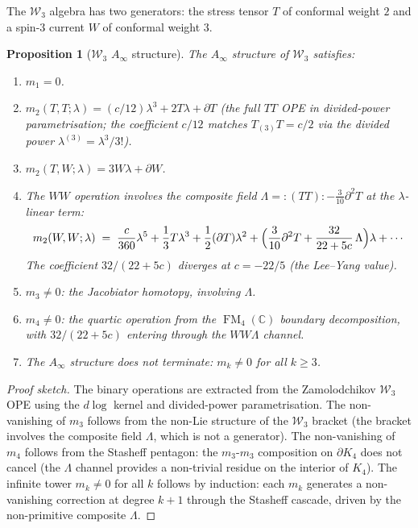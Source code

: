 \documentclass[11pt,reqno]{amsart}
\newtheorem{proposition}[theorem]{Proposition}
\theoremstyle{definition}
\theoremstyle{remark}
\newcommand{\cW}{\mathcal{W}}
\newcommand{\CC}{\mathbb{C}}
\newcommand{\Ainf}{A_{\infty}}
\DeclareMathOperator{\FM}{FM}
\numberwithin{equation}{section}
\providecommand{\ClaimStatusProvedHere}{}
\begin{document}
The $\cW_3$ algebra has two generators: the stress tensor $T$
of conformal weight $2$ and a spin-$3$ current $W$ of conformal
weight $3$.

\begin{proposition}[$\cW_3$ $\Ainf$ structure]
\label{prop:w3-ainf}
\ClaimStatusProvedHere{}
The $\Ainf$ structure of $\cW_3$ satisfies:
\begin{enumerate}[label=(\roman*)]
\item $m_1 = 0$.
\item $m_2(T, T; \lambda) = (c/12)\lambda^3 + 2T\lambda + \partial T$
  (the full $TT$ OPE in divided-power parametrisation; the
  coefficient $c/12$ matches $T_{(3)}T = c/2$ via the divided
  power $\lambda^{(3)} = \lambda^3/3!$).
\item $m_2(T, W; \lambda) = 3W\lambda + \partial W$.
\item The $WW$ operation involves the composite field
  $\Lambda = {}{:}(TT){:} - \frac{3}{10}\partial^2 T$ at the
  $\lambda$-linear term:
  \[
    m_2(W, W; \lambda)
    \;=\;
    \frac{c}{360}\lambda^5
    + \frac{1}{3}T\lambda^3
    + \frac{1}{2}(\partial T)\lambda^2
    + \Bigl(\frac{3}{10}\partial^2 T
      + \frac{32}{22+5c}\,\Lambda\Bigr)\lambda
    + \cdots
  \]
  The coefficient $32/(22+5c)$ diverges at $c = -22/5$
  (the Lee--Yang value).
\item $m_3 \neq 0$: the Jacobiator homotopy, involving $\Lambda$.
\item $m_4 \neq 0$: the quartic operation from the $\FM_4(\CC)$
  boundary decomposition, with $32/(22+5c)$ entering through the
  $WW\Lambda$ channel.
\item The $\Ainf$ structure does not terminate: $m_k \neq 0$
  for all $k \geq 3$.
\end{enumerate}
\end{proposition}

\begin{proof}[Proof sketch]
The binary operations are extracted from the Zamolodchikov
$\cW_3$ OPE \cite{Zam85} using the $d\log$ kernel and divided-power
parametrisation.  The non-vanishing of $m_3$ follows from the
non-Lie structure of the $\cW_3$ bracket (the bracket involves
the composite field $\Lambda$, which is not a generator).  The
non-vanishing of $m_4$ follows from the Stasheff pentagon: the
$m_3$-$m_3$ composition on $\partial K_4$ does not cancel (the
$\Lambda$ channel provides a non-trivial residue on the
interior of $K_4$).  The infinite tower $m_k \neq 0$ for all $k$
follows by induction: each $m_k$ generates a non-vanishing
correction at degree $k+1$ through the Stasheff cascade, driven
by the non-primitive composite $\Lambda$.
\end{proof}
\end{document}

